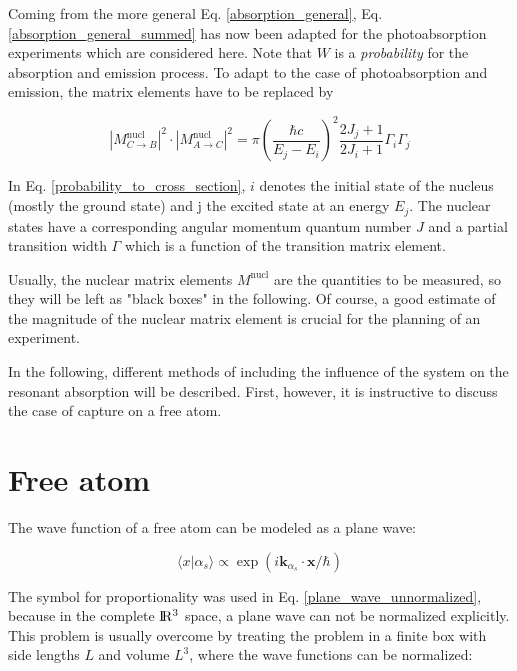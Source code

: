 \documentclass{article}
\begin{document}
Coming from the more general Eq. \ref{absorption_general}, Eq. \ref{absorption_general_summed} has now been adapted for the photoabsorption experiments which are considered here.
Note that $W$ is a \textit{probability} for the absorption and emission process. To adapt to the case of photoabsorption and emission, the matrix elements have to be replaced by \cite{Bet37}

\begin{equation}
	\label{probability_to_cross_section}
	\left| M^{\mathrm{nucl}}_{C \to B} \right|^2 \cdot \left| M^{\mathrm{nucl}}_{A \to C} \right|^2 = \pi \left( \frac{\hbar c}{E_j - E_i} \right)^2 \frac{2 J_j + 1}{2 J_i + 1} \Gamma_i \Gamma_j
\end{equation}

In Eq. \ref{probability_to_cross_section}, $i$ denotes the initial state of the nucleus (mostly the ground state) and j the excited state at an energy $E_j$. The nuclear states have a corresponding angular momentum quantum number $J$ and a partial transition width $\Gamma$ which is a function of the transition matrix element.

Usually, the nuclear matrix elements $M^{\mathrm{nucl}}$ are the quantities to be measured, so they will be left as "black boxes" in the following. 
Of course, a good estimate of the magnitude of the nuclear matrix element is crucial for the planning of an experiment.

In the following, different methods of including the influence of the system on the resonant absorption will be described. First, however, it is instructive to discuss the case of capture on a free atom.

\section{Free atom}
The wave function of a free atom can be modeled as a plane wave:

\begin{equation}
\label{plane_wave_unnormalized}
	\langle x | \alpha_s \rangle \propto \exp{ \left( i \mathbf{k}_{\alpha_s} \cdot \mathbf{x} / \hbar \right) }
\end{equation}

The symbol for proportionality was used in Eq. \ref{plane_wave_unnormalized}, because in the complete $\rm I\!R^3$ space, a plane wave can not be normalized explicitly. 
This problem is usually overcome by treating the problem in a finite box with side lengths $L$ and volume $L^3$, where the wave functions can be normalized:
\end{document}
